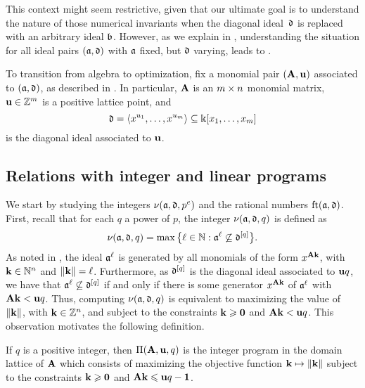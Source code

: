 \documentclass{amsart}
\begin{document}
\begin{remark} \label{reduction to diagonal :R}
   This context might seem restrictive, given that our ultimate goal is to understand the nature of those numerical invariants when the diagonal ideal~$\mathfrak{d}$ is replaced with an arbitrary ideal $\mathfrak{b}$.
   However, as we explain in , understanding the situation for all ideal pairs $(\mathfrak{a}, \mathfrak{d})$ with $\mathfrak{a}$ fixed, but $\mathfrak{d}$ varying, leads to .
\end{remark}

To transition from algebra to optimization, fix a monomial pair $(\mathbf{A}, \mathbf{u})$ associated to $(\mathfrak{a}, \mathfrak{d})$, as described in .  In particular, $\mathbf{A}$ is an $m \times n$ monomial matrix, $\mathbf{u} \in \mathbb{Z}^m$ is a positive lattice point, and
\[ \mathfrak{d} = \langle x^{u_1}, \ldots, x^{u_{m}} \rangle \subseteq \Bbbk[x_1, \ldots, x_{m}] \] is the diagonal ideal associated to $\mathbf{u}$.

\subsection{Relations with integer and linear programs}
We start by studying the integers $\nu(\mathfrak{a}, \mathfrak{d}, p^e)$ and the rational numbers $\operatorname{ft}(\mathfrak{a}, \mathfrak{d})$.
First, recall that for each $q$ a power of $p$, the integer $\nu(\mathfrak{a}, \mathfrak{d}, q)$ is defined as
\[\nu(\mathfrak{a},\mathfrak{d},q) = \max\big\{\ell \in \mathbb{N} : \mathfrak{a}^{\ell} \not\subseteq \mathfrak{d}^{[q]}\big\}.\]
As noted in ,  the ideal $\mathfrak{a}^{\ell}$ is generated by all monomials of the form $x^{\mathbf{A}\mathbf{k}}$, with $\mathbf{k}\in \mathbb{N}^n$ and $\| \mathbf{k} \| = \ell$.  Furthermore, as $\mathfrak{d}^{[q]}$ is the diagonal ideal associated to $\mathbf{u}q$, we have that $\mathfrak{a}^{\ell} \not\subseteq \mathfrak{d}^{[q]}$ if and only if there is some generator $x^{\mathbf{A} \mathbf{k}}$ of $\mathfrak{a}^{\ell}$ with $\mathbf{A}\mathbf{k} < \mathbf{u}q$.  Thus, computing $\nu(\mathfrak{a},\mathfrak{d},q)$ is equivalent to maximizing the value of $\| \mathbf{k} \|$, with $\mathbf{k} \in \mathbb{Z}^n$, and subject to the constraints $\mathbf{k} \geqslant \mathbf{0}$ and $\mathbf{A}\mathbf{k} < \mathbf{u}q$.
This observation motivates the following definition.

\begin{definition}
\label{IP: D}
   If $q$ is a positive integer, then $\Pi(\mathbf{A}, \mathbf{u}, q)$ is the integer program in the domain lattice of $\mathbf{A}$ which consists of maximizing the objective function $\mathbf{k} \mapsto \| \mathbf{k} \|$ subject to the constraints $\mathbf{k} \geqslant \mathbf{0}$ and $\mathbf{A} \mathbf{k} \leqslant \mathbf{u}q - \mathbf{1}$.
\end{definition}
\end{document}
